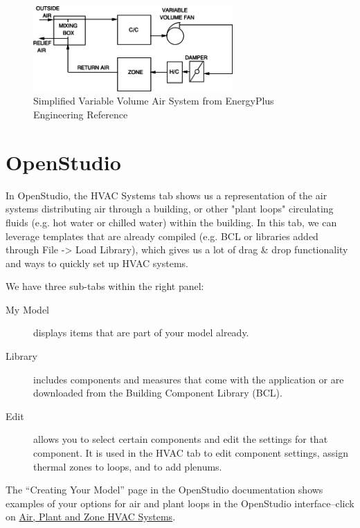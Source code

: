 \documentclass[10pt]{article}
\begin{document}
            \begin{figure}[h]
     \centering
            \includegraphics[width=3in]{extras13/VAVsys.png}
            \caption{Simplified Variable Volume Air System from EnergyPlus Engineering Reference \cite{EPdocs9engineering}}
            \label{vav}
            \end{figure}

\section{OpenStudio}

In OpenStudio, the HVAC Systems tab shows us a representation of the air systems distributing air through a building, or other "plant loops" circulating fluids (e.g. hot water or chilled water) within the building. In this tab, we can leverage templates that are already compiled (e.g. BCL \cite{BCL} or libraries added through File -> Load Library), which gives us a lot of drag \& drop functionality and ways to quickly set up HVAC systems. 

We have three sub-tabs within the right panel: 

\begin{description}
    \item[My Model] displays items that are part of your model already. \cite{OSdocs}
    \item[Library] includes components and measures that come with the application or are downloaded from the Building Component Library (BCL). \cite{OSdocs}
    \item[Edit] allows you to select certain components and edit the settings for that component. It is used in the HVAC tab to edit component settings, assign thermal zones to loops, and to add plenums. \cite{OSdocs}
\end{description}

\noindent
The ``Creating Your Model'' page in the OpenStudio documentation \cite{OSdocs} shows examples of your options for air and plant loops in the OpenStudio interface--click on \href{http://nrel.github.io/OpenStudio-user-documentation/tutorials/creating_your_model/#air-plant-and-zone-hvac-systems}{Air, Plant and Zone HVAC Systems}.
\end{document}
